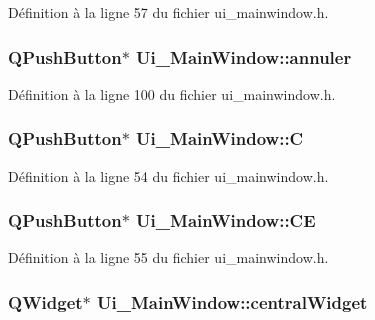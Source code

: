 \-Définition à la ligne 57 du fichier ui\-\_\-mainwindow.\-h.

\hypertarget{class_ui___main_window_afcd80e9772c362343c8b1343fe9cc46f}{
\subsubsection[{annuler}]{\setlength{\rightskip}{0pt plus 5cm}\-Q\-Push\-Button$\ast$ {\bf \-Ui\-\_\-\-Main\-Window\-::annuler}}}\label{class_ui___main_window_afcd80e9772c362343c8b1343fe9cc46f}


\-Définition à la ligne 100 du fichier ui\-\_\-mainwindow.\-h.

\hypertarget{class_ui___main_window_ab159e22a78929113617dcf7d4af66b7e}{
\subsubsection[{\-C}]{\setlength{\rightskip}{0pt plus 5cm}\-Q\-Push\-Button$\ast$ {\bf \-Ui\-\_\-\-Main\-Window\-::\-C}}}\label{class_ui___main_window_ab159e22a78929113617dcf7d4af66b7e}


\-Définition à la ligne 54 du fichier ui\-\_\-mainwindow.\-h.

\hypertarget{class_ui___main_window_a416e9c24bb7c8e85be227044461177ec}{
\subsubsection[{\-C\-E}]{\setlength{\rightskip}{0pt plus 5cm}\-Q\-Push\-Button$\ast$ {\bf \-Ui\-\_\-\-Main\-Window\-::\-C\-E}}}\label{class_ui___main_window_a416e9c24bb7c8e85be227044461177ec}


\-Définition à la ligne 55 du fichier ui\-\_\-mainwindow.\-h.

\hypertarget{class_ui___main_window_a30075506c2116c3ed4ff25e07ae75f81}{
\subsubsection[{central\-Widget}]{\setlength{\rightskip}{0pt plus 5cm}\-Q\-Widget$\ast$ {\bf \-Ui\-\_\-\-Main\-Window\-::central\-Widget}}}\label{class_ui___main_window_a30075506c2116c3ed4ff25e07ae75f81}


